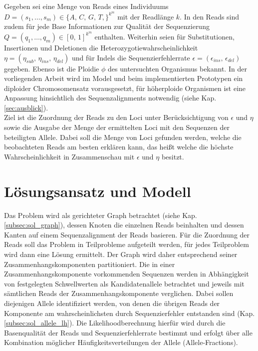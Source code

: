 Gegeben sei eine Menge von Reads eines Individuums $ D = (s_{1}, \dots , s_{m}) \in \{A,\,C,\,G,\,T,\}^{k^m}$ mit der Readlänge $k$. In den Reads sind zudem für jede Base Informationen zur Qualität der Sequenzierung $ Q = (q_{1}, \dots , q_{m}) \in {[0,\,1]}^{k^m}$ enthalten. Weiterhin seien für Substitutionen, Insertionen und Deletionen die Heterozygotiewahrscheinlichkeit $\eta = (\eta_{sub},\, \eta_{ins},\, \eta_{del}) $ und für Indels die Sequenzierfehlerrate $\epsilon=(\epsilon_{ins},\, \epsilon_{del})$ gegeben. Ebenso ist die Ploidie $\phi$ des untersuchten Organismus bekannt. In der vorliegenden Arbeit wird im Model und beim implementierten Prototypen ein diploider Chromosomensatz vorausgesetzt, für höherploide Organismen ist eine Anpassung hinsichtlich des Sequenzalignments notwendig (siehe Kap. \ref{sec:ausblick}). \\

Ziel ist die Zuordnung der Reads zu den Loci unter Berücksichtigung von $\epsilon$ und $\eta$ sowie die Ausgabe der Menge der ermittelten Loci mit den Sequenzen der beteiligten Allele. Dabei soll die Menge von Loci gefunden werden, welche die beobachteten Reads am besten erklären kann, das heißt welche die höchste Wahrscheinlichkeit in Zusammenschau mit $\epsilon$ und $\eta$ besitzt. \\

\section{Lösungsansatz und Modell} \label{sec:solution}

Das Problem wird als gerichteter Graph betrachtet (siehe Kap. \ref{subsec:sol_graph}), dessen Knoten die einzelnen Reads beinhalten und dessen Kanten auf einem Sequenzalignment der Reads basieren. Für die Zuordnung der Reads soll das Problem in Teilprobleme aufgeteilt werden, für jedes Teilproblem wird dann eine Lösung ermittelt. Der Graph wird daher entsprechend seiner Zusammenhangskomponenten partitioniert. Die in einer Zusammenhangskomponente vorkommenden Sequenzen werden in Abhängigkeit von festgelegten Schwellwerten als Kandidatenallele betrachtet und jeweils mit sämtlichen Reads der Zusammenhangskomponente verglichen. Dabei sollen diejenigen Allele identifiziert werden, von denen die übrigen Reads der Komponente am wahrscheinlichsten durch Sequenzierfehler entstanden sind (Kap. \ref{subsec:sol_allele_lh}). Die Likelihoodberechnung hierfür wird durch die Basenqualität der Reads und Sequenzierfehlerrate bestimmt und erfolgt über alle Kombination möglicher Häufigkeitsverteilungen der Allele (Allele-Fractions). \\

